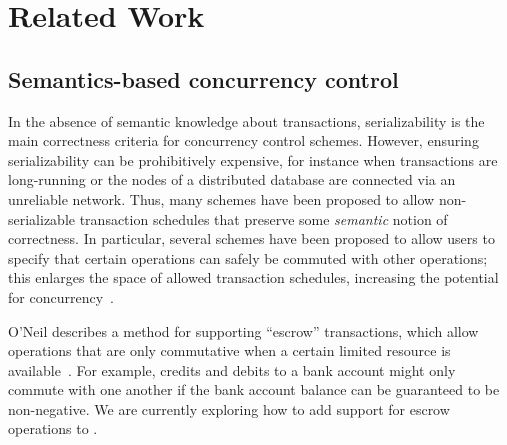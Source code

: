 \section{Related Work}
\label{sec:relwork}


\subsection{Semantics-based concurrency control}
In the absence of semantic knowledge about transactions, serializability is the
main correctness criteria for concurrency control schemes. However, ensuring
serializability can be prohibitively expensive, for instance when transactions
are long-running or the nodes of a distributed database are connected via an
unreliable network. Thus, many schemes have been proposed to allow
non-serializable transaction schedules that preserve some \emph{semantic} notion
of correctness. In particular, several schemes have been proposed to allow users
to specify that certain operations can safely be commuted with other operations;
this enlarges the space of allowed transaction schedules, increasing the
potential for concurrency~\cite{Farrag1989,Garcia-Molina1983,Weihl1988}.


O'Neil describes a method for supporting ``escrow'' transactions, which allow
operations that are only commutative when a certain limited resource is
available~\cite{O'Neil1986}. For example, credits and debits to a bank account
might only commute with one another if the bank account balance can be
guaranteed to be non-negative. We are currently exploring how to add support for
escrow operations to \lang.


